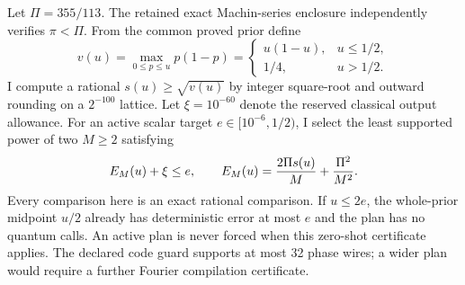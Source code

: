 Let $\Pi=355/113$. The retained exact Machin-series enclosure independently
verifies $\pi<\Pi$. From the common proved prior define
\[
 v(u)=\max_{0\leq p\leq u}p(1-p)
 =\begin{cases}u(1-u),&u\leq1/2,\\1/4,&u>1/2.\end{cases}
\]
I compute a rational $s(u)\geq\sqrt{v(u)}$ by integer square-root and outward
rounding on a $2^{-100}$ lattice. Let $\xi=10^{-60}$ denote the reserved
classical output allowance. For an active scalar target $e\in[10^{-6},1/2)$,
I select the least supported power of two $M\geq2$ satisfying
\begin{equation}
 E_M(u)+\xi\leq e,
 \qquad E_M(u)={2\Pi s(u)\over M}+{\Pi^2\over M^2}.
 \label{eq:qpe-rational-binary-plan}
\end{equation}
Every comparison here is an exact rational comparison. If $u\leq2e$, the
whole-prior midpoint $u/2$ already has deterministic error at most $e$ and
the plan has no quantum calls. An active plan is never forced when this
zero-shot certificate applies. The declared code guard supports at most
32 phase wires; a wider plan would require a further Fourier compilation
certificate.

